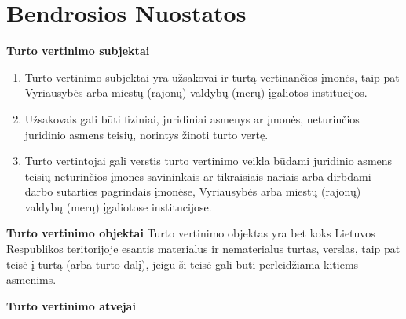 \section{Bendrosios Nuostatos}


\textbf{Turto vertinimo subjektai}

\begin{enumerate}
    \item Turto vertinimo subjektai yra užsakovai ir turtą vertinančios įmonės, taip pat Vyriausybės arba miestų (rajonų) valdybų (merų) įgaliotos institucijos.
    \item Užsakovais gali būti fiziniai, juridiniai asmenys ar įmonės, neturinčios juridinio asmens teisių, norintys žinoti turto vertę.
    \item Turto vertintojai gali verstis turto vertinimo veikla būdami juridinio asmens teisių neturinčios įmonės savininkais ar tikraisiais nariais arba dirbdami darbo sutarties pagrindais įmonėse, Vyriausybės arba miestų (rajonų) valdybų (merų) įgaliotose institucijose.
\end{enumerate}



\textbf{Turto vertinimo objektai}
    Turto vertinimo objektas yra bet koks Lietuvos Respublikos teritorijoje esantis materialus ir nematerialus turtas, verslas, taip pat teisė į turtą (arba turto dalį), jeigu ši teisė gali būti perleidžiama kitiems asmenims.



\textbf{Turto vertinimo atvejai}

